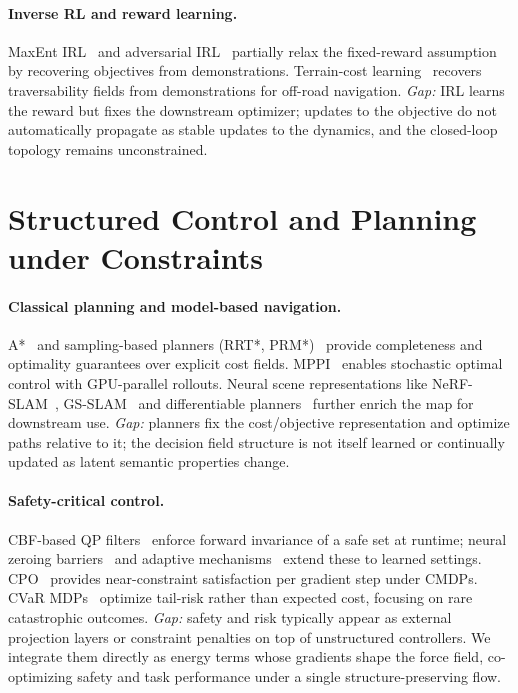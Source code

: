 \paragraph{Inverse RL and reward learning.}
MaxEnt IRL~\citep{ziebart2008maximum} and adversarial
IRL~\citep{luo2024c} partially relax the fixed-reward assumption
by recovering objectives from demonstrations.
Terrain-cost learning~\citep{sathyamoorthy2022terrapn} recovers
traversability fields from demonstrations for off-road navigation.
\emph{Gap:} IRL learns the reward but fixes the downstream optimizer;
updates to the objective do not automatically propagate as stable
updates to the dynamics, and the closed-loop topology remains
unconstrained.

\section{Structured Control and Planning under Constraints}
\label{sec:rw:structured}

\paragraph{Classical planning and model-based navigation.}
A*~\citep{hart1968formal} and sampling-based planners
(RRT*, PRM*)~\citep{karaman2011sampling} provide completeness and
optimality guarantees over explicit cost fields.
MPPI~\citep{williams2017mppi} enables stochastic optimal control
with GPU-parallel rollouts.
Neural scene representations like NeRF-SLAM~\citep{Zhu2022CVPR,sucar2021imap},
GS-SLAM~\citep{keetha2024splatamsplattrack} and differentiable
planners~\citep{gupta2019cognitivemappingplanningvisual} further enrich the map for
downstream use.
\emph{Gap:} planners fix the cost/objective representation and optimize
paths relative to it; the decision field structure is not itself learned
or continually updated as latent semantic properties change.

\paragraph{Safety-critical control.}
CBF-based QP filters~\citep{ames2016control} enforce forward
invariance of a safe set at runtime; neural zeroing
barriers~\citep{feng2023safergapgapbasedlocal} and adaptive
mechanisms~\citep{mohammad2025sac} extend these to learned settings.
CPO~\citep{achiam2017constrained} provides near-constraint satisfaction
per gradient step under CMDPs.
CVaR MDPs~\citep{chow2015risk} optimize tail-risk rather than expected
cost, focusing on rare catastrophic outcomes.
\emph{Gap:} safety and risk typically appear as external projection
layers or constraint penalties on top of unstructured controllers.
We integrate them directly as energy terms whose gradients
shape the force field, co-optimizing safety and task performance under
a single structure-preserving flow.

